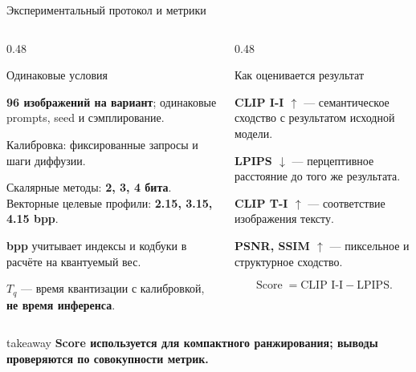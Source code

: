 \documentclass[aspectratio=169,10pt]{beamer}
\newcommand{\keypoint}[1]{%
  \begin{beamercolorbox}[
    sep=1.8mm,
    wd=\linewidth
  ]{takeaway}
    \small\bfseries #1
  \end{beamercolorbox}%
}
\newcommand{\score}{\operatorname{Score}}
\begin{document}

\begin{frame}[t]{Экспериментальный протокол и метрики}
  \vspace{-2mm}

  \begin{columns}[T,onlytextwidth]

    \begin{column}{0.48\textwidth}
      \begin{block}{Одинаковые условия}
        \small

        \textbf{96 изображений на вариант};
        одинаковые prompts, seed и сэмплирование.
        \par\smallskip

        Калибровка: фиксированные запросы
        и шаги диффузии.
        \par\smallskip

        Скалярные методы:
        \textbf{2, 3, 4 бита}.
        Векторные целевые профили:
        \textbf{2.15, 3.15, 4.15 bpp}.
        \par\smallskip

        \textbf{bpp} учитывает индексы и кодбуки
        в расчёте на квантуемый вес.
        \par\smallskip

        $T_q$ --- время квантизации с калибровкой,
        \textbf{не время инференса}.
      \end{block}
    \end{column}

    \begin{column}{0.48\textwidth}
      \begin{block}{Как оценивается результат}
        \small

        \textbf{CLIP I-I $\uparrow$} ---
        семантическое сходство
        с результатом исходной модели.
        \par\smallskip

        \textbf{LPIPS $\downarrow$} ---
        перцептивное расстояние
        до того же результата.
        \par\smallskip

        \textbf{CLIP T-I $\uparrow$} ---
        соответствие изображения тексту.
        \par\smallskip

        \textbf{PSNR, SSIM $\uparrow$} ---
        пиксельное и структурное сходство.
      \end{block}

      \[
        \score
        =
        \text{CLIP I-I}
        -
        \mathrm{LPIPS}.
      \]
    \end{column}

  \end{columns}

  \vfill

  \keypoint{
    Score используется для компактного ранжирования;
    выводы проверяются по совокупности метрик.
  }
\end{frame}
\end{document}
